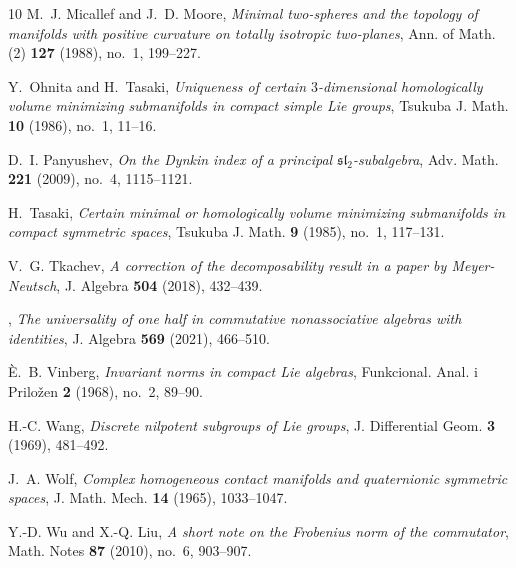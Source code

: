 \begin{thebibliography}{10}
M.~J. Micallef and J.~D. Moore, \emph{Minimal two-spheres and the topology of
  manifolds with positive curvature on totally isotropic two-planes}, Ann. of
  Math. (2) \textbf{127} (1988), no.~1, 199--227.

Y.~Ohnita and H.~Tasaki, \emph{Uniqueness of certain {$3$}-dimensional
  homologically volume minimizing submanifolds in compact simple {L}ie groups},
  Tsukuba J. Math. \textbf{10} (1986), no.~1, 11--16.

D.~I. Panyushev, \emph{On the {D}ynkin index of a principal
  {$\mathfrak{sl}_2$}-subalgebra}, Adv. Math. \textbf{221} (2009), no.~4,
  1115--1121.

H.~Tasaki, \emph{Certain minimal or homologically volume minimizing
  submanifolds in compact symmetric spaces}, Tsukuba J. Math. \textbf{9}
  (1985), no.~1, 117--131.

V.~G. Tkachev, \emph{A correction of the decomposability result in a paper by
  {M}eyer-{N}eutsch}, J. Algebra \textbf{504} (2018), 432--439.

\bysame, \emph{The universality of one half in commutative nonassociative
  algebras with identities}, J. Algebra \textbf{569} (2021), 466--510.

{\`E}.~B. Vinberg, \emph{Invariant norms in compact {L}ie algebras},
  Funkcional. Anal. i Prilo\v zen \textbf{2} (1968), no.~2, 89--90.

H.-C. Wang, \emph{Discrete nilpotent subgroups of {L}ie groups}, J.
  Differential Geom. \textbf{3} (1969), 481--492.

J.~A. Wolf, \emph{Complex homogeneous contact manifolds and quaternionic
  symmetric spaces}, J. Math. Mech. \textbf{14} (1965), 1033--1047.

Y.-D. Wu and X.-Q. Liu, \emph{A short note on the {F}robenius norm of the
  commutator}, Math. Notes \textbf{87} (2010), no.~6, 903--907.

\end{thebibliography}
